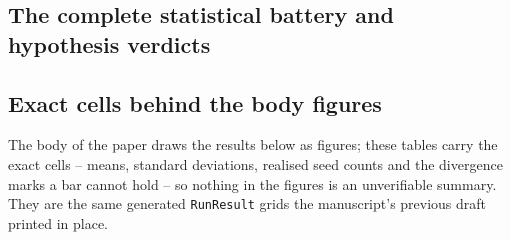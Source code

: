 \documentclass[review,12pt]{elsarticle}
\begin{document}
\begin{table}[tbp]
\centering
\caption{Spiking input-coding and unroll-length ablation (T2e, random split, 9 seeds)}
\label{tab:coding}

\end{table}

\begin{table}[tbp]
\centering
\caption{FedProx proximal-weight ablation against paired FedAvg (random split)}
\label{tab:fedprox}

\end{table}

\subsection{The complete statistical battery and hypothesis verdicts}
\label{sec:sup-res-stats}

\begin{landscape}
\begin{table}[p]
\centering
\caption{Complete pre-registered statistical battery (random split)}
\label{tab:stats}

\end{table}
\end{landscape}

\begin{table}[tbp]
\centering
\caption{Verdicts against the pre-registered hypotheses}
\label{tab:hypotheses}

\end{table}

\subsection{Exact cells behind the body figures}
\label{sec:sup-figcells}

The body of the paper draws the results below as figures; these tables
carry the exact cells -- means, standard deviations, realised seed counts
and the divergence marks a bar cannot hold -- so nothing in the figures
is an unverifiable summary. They are the same generated
\texttt{RunResult} grids the manuscript's previous draft printed in
place.

\begin{table}[tbp]
\centering
\caption{Reference frame, chronological against random split (15 seeds)}
\label{tab:temporal_frame}

\end{table}
\end{document}
